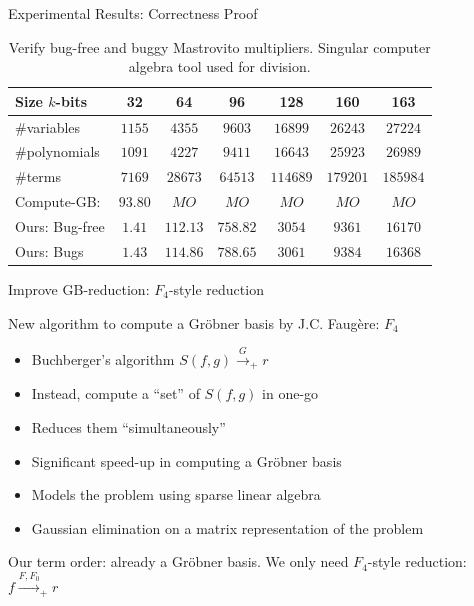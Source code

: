 \documentclass[xcolor=dvipsnames]{beamer}
\begin{document}


\begin{frame}{\large{Experimental Results: Correctness Proof}}

\begin{table}[h!]
\begin{center}
\caption{\small Verify bug-free and buggy Mastrovito
  multipliers.  {\sc Singular} computer algebra
  tool used for division. }  
\label{tab:ours}
\begin{tabular}{|l||c|c|c|c|c|c|} \hline 
Size $k$-bits& 32  & 64 & 96 & 128  &160 &163\\
\hline
\#variables &$1155$ &$4355$ &$9603$ &$16899$ &$26243$ &$27224$ \\
\hline
\#polynomials &$1091$  &$4227$ &$9411$ &$16643$ &$25923$ &$26989$ \\
\hline
\#terms &$7169$  &$28673$ &$64513$ &$114689$ &$179201$ &$185984$ \\
\hline
Compute-GB:& $93.80$  & $MO$ &$MO$ &$MO$ &$MO$ &$MO$ \\
\hline
Ours: Bug-free&$1.41$ &$112.13$ &$758.82$ &$3054$ &$9361$ &$16170$ \\
\hline
Ours: Bugs& $1.43$  &$114.86$ &$788.65$ &$3061$  &$9384$ &$16368$\\
\hline
\end{tabular}
\end{center}
\end{table}


\end{frame}


\begin{frame}{\large{Improve GB-reduction: $F_4$-style reduction}}

New algorithm to compute a Gr\"obner basis by J.C. Faug\`{e}re: $F_4$
\begin{itemize}
\item Buchberger's algorithm $S(f, g) \stackrel{G}{\textstyle\longrightarrow}_+
r$
\item Instead, compute a ``set'' of $S(f, g)$ in one-go
\item Reduces them ``simultaneously''
\item Significant speed-up in computing a Gr\"obner basis
\item Models the problem using \alert{sparse linear algebra}
\item Gaussian elimination on a matrix representation of the problem
\end{itemize}

Our term order: already a Gr\"obner basis. We only need $F_4$-style
reduction: $f \xrightarrow{F, F_0}_+r$
\end{frame}
\end{document}
